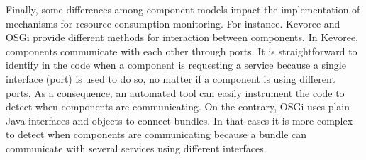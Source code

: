
Finally, some differences among component models impact the implementation of mechanisms for resource consumption monitoring.
For instance. Kevoree and OSGi provide different methods for interaction between components.
In Kevoree, components communicate with each other through ports.
It is straightforward to identify in the code when a component is requesting a service because a single interface (port) is used to do so, no matter if a component is using different ports. 
As a consequence, an automated tool can easily instrument the code to detect when components are communicating.
On the contrary, OSGi uses plain Java interfaces and objects to connect bundles.
In that cases it is more complex to detect when components are communicating because a bundle can communicate with several services using different interfaces. 

%


